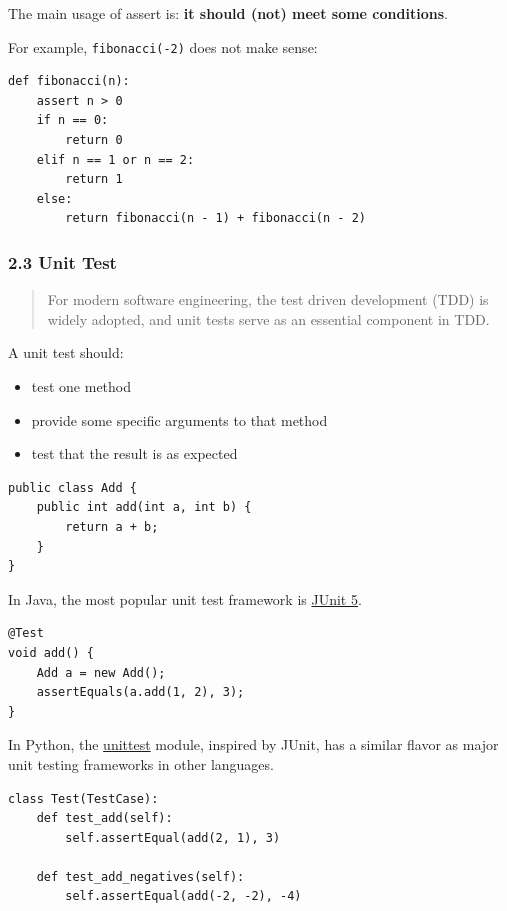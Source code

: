 \documentclass[aspectratio=169, 14pt]{beamer}
\begin{document}
\begin{frame}[fragile]
The main usage of \alert{assert} is: \textbf{it should (not) meet some conditions}.

For example, \texttt{fibonacci(-2)} does not make sense:

\begin{verbatim}
def fibonacci(n):
    assert n > 0
    if n == 0:
        return 0
    elif n == 1 or n == 2:
        return 1
    else:
        return fibonacci(n - 1) + fibonacci(n - 2) 
\end{verbatim}  

\end{frame}

\begin{frame}
    \frametitle{2.3 Unit Test}
\begin{quote}
    For modern software engineering, the test driven development (TDD) is widely adopted, and \alert{unit tests} serve as an essential component in TDD. 
\end{quote}

A unit test should:
\begin{itemize}
    \item test one method
    \item provide some specific arguments to that method
    \item test that the result is as expected
\end{itemize}
\end{frame}

\begin{frame}[fragile]

    \begin{verbatim}
public class Add {
    public int add(int a, int b) {
        return a + b;
    }
}
    \end{verbatim}  
In Java, the most popular unit test framework is \href{https://junit.org/junit5/}{JUnit 5}.

\begin{verbatim}
@Test
void add() {
    Add a = new Add();
    assertEquals(a.add(1, 2), 3);
}    
\end{verbatim}

\end{frame}

\begin{frame}[fragile]
In Python, the \href{https://docs.python.org/3/library/unittest.html}{unittest} module, inspired by JUnit, has a similar flavor as major unit testing frameworks in other languages.
\begin{verbatim}
class Test(TestCase):
    def test_add(self):
        self.assertEqual(add(2, 1), 3)

    def test_add_negatives(self):
        self.assertEqual(add(-2, -2), -4)    
\end{verbatim}

\end{frame}
\end{document}
